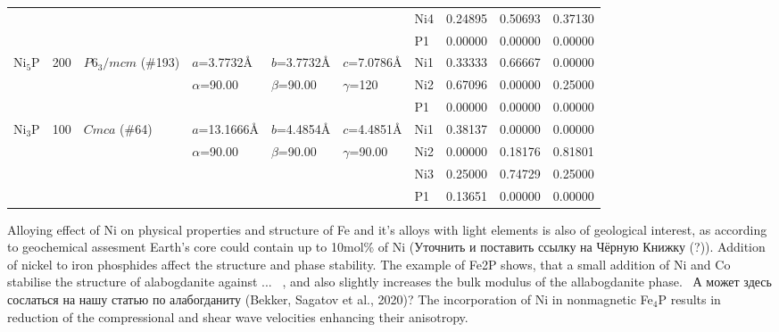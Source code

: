 \documentclass[twoside,twocolumn,9pt]{article}
\begin{document}
\begin{table}[t]
\begin{tabular*}{\textwidth}{@{\extracolsep{\fill}}llllllllll}
               &     &               &                  &                 &                  & Ni4 &  0.24895 & 0.50693 & 0.37130 \\
               &     &               &                  &                 &                  & P1  &  0.00000 & 0.00000 & 0.00000 \\
\midrule
    Ni$_{5}$P  & 200 & $P6_3/mcm$ (\#193)  & $a$=3.7732\AA    & $b$=3.7732\AA   & $c$=7.0786\AA    & Ni1 & 0.33333   &  0.66667  &   0.00000  \\
               &     &                    & $\alpha$=90.00   & $\beta$=90.00 & $\gamma$=120       & Ni2 & 0.67096   &  0.00000  &   0.25000  \\
               &     &                    &                  &                 &                  & P1 &  0.00000    & 0.00000   &  0.00000  \\
\midrule
    Ni$_{3}$P  & 100 & $Cmca$ (\#64) & $a$=13.1666\AA   & $b$=4.4854\AA   & $c$=4.4851\AA    & Ni1 & 0.38137   &  0.00000  &   0.00000  \\
               &     &               & $\alpha$=90.00   & $\beta$=90.00   & $\gamma$=90.00   & Ni2 & 0.00000   &  0.18176  &   0.81801  \\
               &     &               &                  &                 &                  & Ni3 & 0.25000   &  0.74729  &   0.25000  \\   
               &     &               &                  &                 &                  & P1 &  0.13651    & 0.00000   &  0.00000  \\
\hline
  \end{tabular*}
\end{table}




Alloying effect of Ni on physical properties and structure of Fe and it's alloys with light elements is also of geological interest, as according to geochemical assesment Earth's core could contain up to 10mol\% of Ni \cite{} (Уточнить и поставить ссылку на Чёрную Книжку (?)).
Addition of nickel to iron phosphides affect the structure and phase stability. 
The example of Fe2P shows, that a small addition of Ni and Co stabilise the structure of alabogdanite against ... ~\cite{Britvin-2002, Buseck1969, Nisar-2010-EPSL}, and also slightly increases the  bulk modulus of the allabogdanite phase.~\cite{Nisar-2010-EPSL} 
А может здесь сослаться на нашу статью по алабогданиту (Bekker, Sagatov et al., 2020)?
The incorporation of Ni in nonmagnetic Fe$_4$P results in reduction of the compressional and shear wave velocities enhancing their anisotropy.\cite{Wu-2011-GRL}
\end{document}

